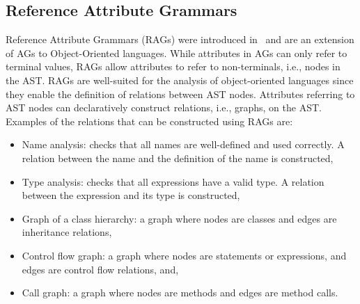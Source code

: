 \subsection{Reference Attribute Grammars}
\label{sec:rag}
Reference Attribute Grammars (RAGs) were introduced in~\cite{DBLP:journals/informaticaSI/Hedin00}
and are an extension of AGs to Object-Oriented languages. While attributes in AGs
can only refer to terminal values, RAGs allow attributes to refer to non-terminals, i.e., nodes in the AST.
RAGs are well-suited for the analysis of object-oriented languages since they enable
the definition of relations between AST nodes. Attributes referring
to AST nodes can declaratively construct relations, i.e., graphs, on the AST.
Examples of the relations that can be constructed using RAGs are:
\begin{itemize}
    \item Name analysis: checks that all names are well-defined and used correctly. A relation between
    the name and the definition of the name is constructed,
    \item Type analysis: checks that all expressions have a valid type. A relation between the expression
    and its type is constructed,
    \item Graph of a class hierarchy: a graph where nodes are classes and edges are inheritance relations,
    \item Control flow graph: a graph where nodes are statements or expressions, and edges are control flow relations, and,
    \item Call graph: a graph where nodes are methods and edges are method calls.
\end{itemize}

